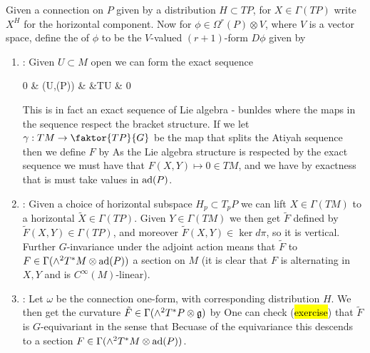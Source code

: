 \documentclass{article}
\begin{document}
\begin{definition}
	Given a connection on $P$ given by a distribution $H \subset TP$, for $X \in \Gamma(TP)$ write $X^H$ for the horizontal component. Now for $\phi \in \Omega^r(P) \otimes V$, where $V$ is a vector space, define the  of $\phi$ to be the $V$-valued $(r+1)$-form $D\phi$ given by
\end{definition}
\begin{enumerate}
	\item {}: Given $U\subset M$ open we can form the exact sequence 
	\begin{tkz}
		0 \arrow[r] & \Gamma(U,\ad(P)) \arrow[r] & \Gamma{} \arrow[r] &TU \arrow[r] & 0 
	\end{tkz}
This is in fact an exact sequence of Lie algebra - bunldes where the maps in the sequence respect the bracket structure. If we let $\gamma : TM \to \faktor{TP}{G}$ be the map that splits the Atiyah sequence then we define $F$ by 
As the Lie algebra structure is respected by the exact sequence we must have that $F(X,Y) \mapsto 0 \in TM$, and we have by exactness that is must take values in $\operatorname{ad}(P)$. 
	\item {}: Given a choice of horizontal subspace $H_p \subset T_pP$ we can lift $X \in \Gamma(TM)$ to a horizontal $\tilde{X} \in \Gamma(TP)$. Given $Y\in \Gamma(TM)$ we then get $\tilde{F}$ defined by 
$\tilde{F}(X,Y) \in \Gamma(TP)$, and moreover $\tilde{F}(X,Y) \in \ker d\pi$, so it is vertical. Further $G$-invariance under the adjoint action means that $\tilde{F}$ to $F \in \Gamma(\wedge^2 T^\ast M \otimes \operatorname{ad}(P))$ a section on $M$ (it is clear that $F$ is alternating in $X,Y$ and is $C^\infty(M)$-linear). 
	\item {}: Let $\omega$ be the connection one-form, with corresponding distribution $H$. We then get the curvature $\tilde{F} \in \Gamma(\wedge^2 T^\ast P \otimes \mathfrak{g})$ by 
One can check (\hl{exercise}) that $\tilde{F}$ is $G$-equivariant in the sense that 
Becuase of the equivariance this descends to a section $F \in \Gamma(\wedge^2 T^\ast M \otimes \operatorname{ad}(P))$. 
\end{enumerate}
\end{document}
